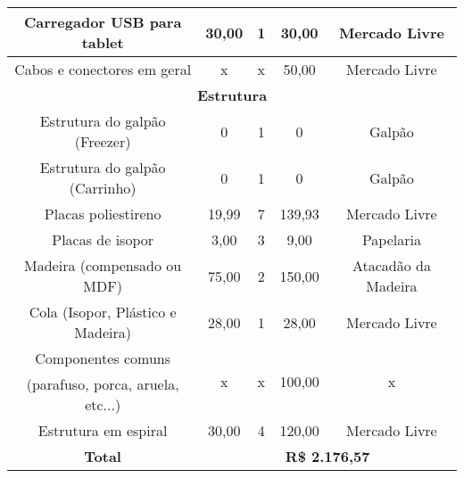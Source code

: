 \begin{longtable}{|c|c|c|c|c|}
\hline 
Carregador USB para tablet & 30,00 & 1 & 30,00 & Mercado Livre\tabularnewline
\hline 
Cabos e conectores em geral & x & x & 50,00 & Mercado Livre\tabularnewline
\hline 
\multicolumn{5}{|c|}{\textbf{Estrutura}}\tabularnewline
\hline 
Estrutura do galpão (Freezer) & 0 & 1 & 0 & Galpão\tabularnewline
\hline 
Estrutura do galpão (Carrinho) & 0 & 1 & 0 & Galpão\tabularnewline
\hline 
Placas poliestireno & 19,99 & 7 & 139,93 & Mercado Livre\tabularnewline
\hline 
Placas de isopor & 3,00 & 3 & 9,00 & Papelaria\tabularnewline
\hline 
Madeira (compensado ou MDF) & 75,00 & 2 & 150,00 & Atacadão da Madeira\tabularnewline
\hline 
Cola (Isopor, Plástico e Madeira) & 28,00 & 1 & 28,00 & Mercado Livre\tabularnewline
\hline 
Componentes comuns  & \multirow{2}{*}{x} & \multirow{2}{*}{x} & \multirow{2}{*}{100,00} & \multirow{2}{*}{x}\tabularnewline
(parafuso, porca, aruela, etc...) &  &  &  & \tabularnewline
\hline 
Estrutura em espiral & 30,00 & 4 & 120,00 & Mercado Livre\tabularnewline
\hline 
\textbf{Total} & \multicolumn{4}{c|}{\textbf{R\$ 2.176,57}}\tabularnewline
\hline 
\end{longtable}
